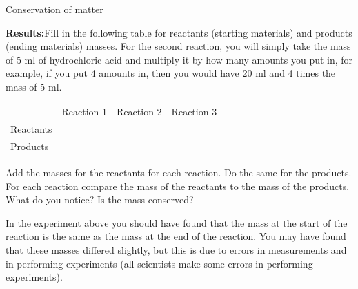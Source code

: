 \begin{g_experiment}{Conservation of matter}
        \par \label{m38711*eip-768}\noindent{}\textbf{Results:}Fill in the following table for reactants (starting materials) and products (ending materials) masses. For the second reaction, you will simply take the mass of 5 ml of hydrochloric acid and multiply it by how many amounts you put in, for example, if you put 4 amounts in, then you would have 20 ml and 4 times the mass of 5 ml. \par 
          \begin{table}[H]
        \begin{center}
      \label{m38711*eip-581}
    \noindent
      \tablelasttail{}
      \begin{xtabular}[t]{|l|l|l|l|}\hline
         &
        Reaction 1 &
        Reaction 2 &
        Reaction 3%
     \tabularnewline{}
        Reactants &
         &
         &
     \tabularnewline{}
        Products &
         &
         &
     \tabularnewline{}
    \end{xtabular}
      \end{center}
\end{table}
    \par
  \label{m38711*eip-634}Add the masses for the reactants for each reaction. Do the same for the products. For each reaction compare the mass of the reactants to the mass of the products. What do you notice? Is the mass conserved?\par \label{m38711*eip-65}In the experiment above you should have found that the mass at the start of the reaction is the same as the mass at the end of the reaction. You may have found that these masses differed slightly, but this is due to errors in measurements and in performing experiments (all scientists make some errors in performing experiments).  \par
\end{g_experiment} 
    \label{m38711*cid6}
